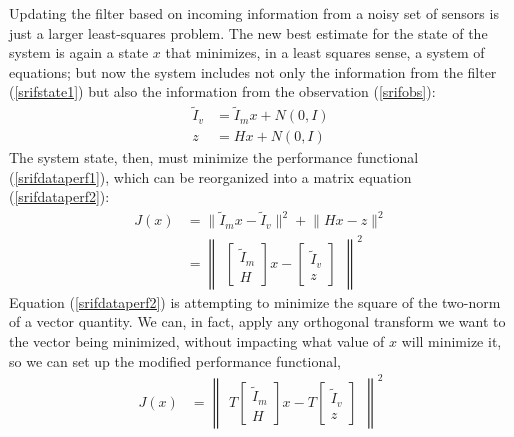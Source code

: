 Updating the filter based on incoming information
from a noisy set of sensors
is just a larger least-squares problem.
The new best estimate for the state of the system
is again a state $x$ that minimizes,
in a least squares sense,
a system of equations;
but now the system includes not only the information
from the filter (\ref{srifstate1})
but also the information from the observation (\ref{srifobs}):
\begin{subequations}
\begin{align}
  {\tilde I}_v & = {\tilde I}_m x + N(0,I)
\label{srifstate1}
\\
  z & = H x + N(0,I)
\label{srifobs}
\end{align}
\end{subequations}
The system state, then, must minimize the performance functional
(\ref{srifdataperf1}),
which can be reorganized into a matrix equation
(\ref{srifdataperf2}):
\begin{subequations}
\begin{align}
J(x) & =  \lVert {\tilde I}_m x   - {\tilde I}_v \rVert ^ 2
       +  \lVert            H x   - z            \rVert ^ 2
\label{srifdataperf1}
\\
  & = \begin{Vmatrix}
        \begin{bmatrix} {\tilde I}_m \\ H \end{bmatrix} x -
        \begin{bmatrix} {\tilde I}_v \\ z \end{bmatrix}
      \end{Vmatrix}^2
\label{srifdataperf2}
\end{align}
\end{subequations}
Equation (\ref{srifdataperf2}) is attempting to minimize
the square of the two-norm of a vector quantity.
We can, in fact, apply any orthogonal transform we want
to the vector being minimized,
without impacting what value of $x$ will minimize it,
so we can set up the modified performance functional,
\begin{align}
J(x) & = \begin{Vmatrix}
      T \begin{bmatrix} {\tilde I}_m \\ H \end{bmatrix} x -
      T \begin{bmatrix} {\tilde I}_v \\ z \end{bmatrix}
      \end{Vmatrix}^2
\label{srifdataperf3}
\end{align}
